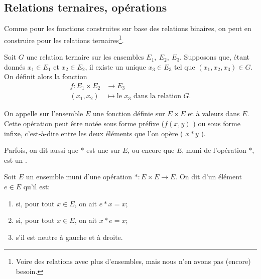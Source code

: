 \subsection{Relations ternaires, opérations}
\label{SUBooRelationsTernaires}

\begin{normaltext}	\label{NORMooRelationsTernaires}
	Comme pour les fonctions construites sur base des relations binaires, on peut en construire pour les relations ternaires\footnote{Voire des relations avec plus d'ensembles, mais nous n'en avons pas (encore) besoin.}.
\end{normaltext}

\begin{normaltext}	\label{NORMooFonctionDeuxVariables}
	Soit \( G \) une relation ternaire sur les ensembles  \( E_1,\ E_2, \ E_3 \). Supposons que, étant donnés \(x_1 \in E_1 \) et \(x_2 \in E_2 \), il existe un unique \(x_3 \in E_3 \) tel que \( (x_1, x_2, x_3) \in G \). On définit alors la fonction
	\begin{equation}
		\begin{aligned}
			f\colon E_1 \times E_2 & \to E_3                                          \\
			(x_1, x_2)             & \mapsto \text{le }x_3\text{ dans la relation }G.
		\end{aligned}
	\end{equation}
\end{normaltext}

\begin{definition}  \label{DEFooOperation}
	On appelle  sur l'ensemble \( E \) une fonction définie sur \( E \times E \) et à valeurs dans  \( E \). Cette opération peut être notée sous forme préfixe (\( f(x, y) \) ) ou sous forme infixe, c'est-à-dire entre les deux éléments que l'on opère ( \( x * y \) ).

	Parfois, on dit aussi que \( * \) est une  sur \( E \), ou encore que \( E \), muni de l'opération \( * \), est un .
\end{definition}

\begin{definition}	\label{DEFooMagmaNeutre}
	Soit \( E \) un ensemble muni d'une opération \( *\colon E\times E\to E\). On dit d'un élément \( e \in E \) qu'il est:
	\begin{enumerate}
		\item
		       si, pour tout \( x \in E \), on ait \( e*x = x \);
		\item
		       si, pour tout \( x \in E \), on ait \( x*e = x \);
		\item
		       s'il est neutre à gauche et à droite.
	\end{enumerate}
\end{definition}

